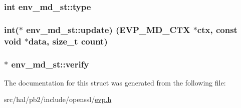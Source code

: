 \subsubsection[{\texorpdfstring{type}{type}}]{\setlength{\rightskip}{0pt plus 5cm}int env\+\_\+md\+\_\+st\+::type}\hypertarget{structenv__md__st_a23f72d7bf1652d69a85942f66f55df01}{}\label{structenv__md__st_a23f72d7bf1652d69a85942f66f55df01}
\subsubsection[{\texorpdfstring{update}{update}}]{\setlength{\rightskip}{0pt plus 5cm}int($\ast$ env\+\_\+md\+\_\+st\+::update) ({\bf E\+V\+P\+\_\+\+M\+D\+\_\+\+C\+TX} $\ast$ctx, const void $\ast$data, size\+\_\+t count)}\hypertarget{structenv__md__st_a57339bd5446e71a0a827f12d8ba23e40}{}\label{structenv__md__st_a57339bd5446e71a0a827f12d8ba23e40}
\subsubsection[{\texorpdfstring{verify}{verify}}]{$\ast$ env\+\_\+md\+\_\+st\+::verify}\hypertarget{structenv__md__st_a887c2442c79f20fd0c47fba0dd100eb2}{}\label{structenv__md__st_a887c2442c79f20fd0c47fba0dd100eb2}


The documentation for this struct was generated from the following file\+:\begin{DoxyCompactItemize}
\item 
src/hal/pb2/include/openssl/\hyperlink{evp_8h}{evp.\+h}\end{DoxyCompactItemize}
